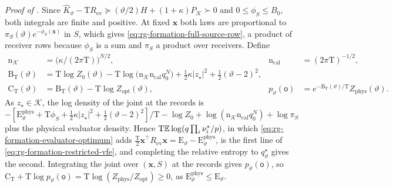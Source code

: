 \noindent\emph{Proof of .}
Since \(\widehat K_\vartheta-\mathrm TR_{\mathrm{ev}}\succeq(\vartheta/2)H
+(1+\kappa)P_{\mathcal K}\succ0\) and \(0\le\phi_S\le B_0\), both integrals are
finite and positive. At fixed \(\mathbf x\) both laws are proportional to
\(\pi_S(\vartheta)e^{-\phi_S(\mathbf x)}\) in \(S\), which gives
\cref{eq:rg-formation-full-source-row}, a product of receiver rows because
\(\phi_S\) is a sum and \(\pi_S\) a product over receivers. Define
\begin{equation}
\begin{aligned}
\mathrm n_{\mathcal K}&=\bigl(\kappa/(2\pi\mathrm T)\bigr)^{N/2},&
\mathrm n_{\mathrm{cal}}&=(2\pi\mathrm T)^{-1/2},\\
\mathrm B_{\mathrm T}(\vartheta)
 &=\mathrm T\log Z_0(\vartheta)
   -\mathrm T\log\bigl(\mathrm n_{\mathcal K}\mathrm n_{\mathrm{cal}}q_0^N\bigr)
   +\tfrac12\kappa|z_\star|^2+\tfrac12(\vartheta-2)^2,\\
\mathrm C_{\mathrm T}(\vartheta)&=\mathrm B_{\mathrm T}(\vartheta)
   -\mathrm T\log Z_{\mathrm{opt}}(\vartheta),&
p_\vartheta(\mathsf o)&=e^{-\mathrm B_{\mathrm T}(\vartheta)/\mathrm T}
                         Z_{\mathrm{phys}}(\vartheta).
\end{aligned}
\label{eq:rg-formation-evidence-scalar}
\end{equation}
As \(z_\star\in\mathcal K\), the log density of the joint at the records is
\(-[\mathrm E^{\mathrm{phys}}_\vartheta+\mathrm T\phi_S+\tfrac12\kappa|z_\star|^2
+\tfrac12(\vartheta-2)^2]/\mathrm T-\log Z_0
+\log(\mathrm n_{\mathcal K}\mathrm n_{\mathrm{cal}}q_0^N)+\log\pi_S\) plus the
physical evaluator density. Hence \(\mathrm T\mathbb E\log(q\prod_i\nu_i^*/p)\), in
which \cref{eq:rg-formation-evaluator-optimum} adds
\(\tfrac{\mathrm T}2\mathbf x^\top R_{\mathrm{ev}}\mathbf x
=\mathrm E_\vartheta-\mathrm E^{\mathrm{phys}}_\vartheta\), is the first line
of \cref{eq:rg-formation-restricted-vfe}, and completing the relative entropy
to \(q^\star_\vartheta\) gives the second. Integrating the joint over
\((\mathbf x,S)\) at the records gives \(p_\vartheta(\mathsf o)\), so
\(\mathrm C_{\mathrm T}+\mathrm T\log p_\vartheta(\mathsf o)
=\mathrm T\log(Z_{\mathrm{phys}}/Z_{\mathrm{opt}})\ge0\), as
\(\mathrm E^{\mathrm{phys}}_\vartheta\le\mathrm E_\vartheta\).

